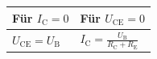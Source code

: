 			\begin{table}[h]
			\begin{tabular}{l|l}
			Für $I_{\mathrm{C}}=0$ & Für $U_{\mathrm{CE}}=0$\\
			\toprule
			$U_{\mathrm{CE}}=U_{\mathrm{B}}$ & $I_{\mathrm{C}}=\frac{U_{\mathrm{B}}}{R_{\mathrm{C}}+R_{\mathrm{E}}}$\\
			\end{tabular}
			\end{table}
